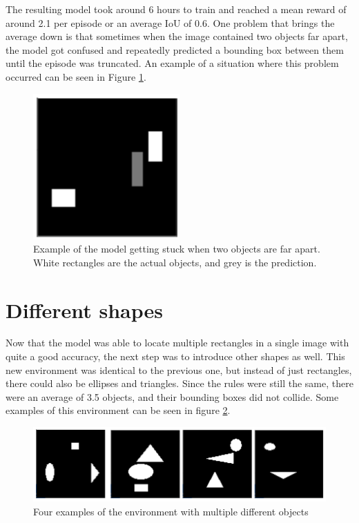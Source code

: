 \documentclass[
  digital,     %
  oneside,     %
  nosansbold,  %
  nocolorbold, %
  lof,         %
  lot,         %
]{fithesis4}
\begin{document}
The resulting model took around 6 hours to train and reached a mean reward of around 2.1 per episode or an average IoU of 0.6. One problem that brings the average down is that sometimes when the image contained two objects far apart, the model got confused and repeatedly predicted a bounding box between them until the episode was truncated. An example of a situation where this problem occurred can be seen in Figure \ref{fig:v3_stuck}.

\begin{figure}
    \centering
    \includegraphics[width=0.5\linewidth]{results/v3_stuck.png}
    \caption{Example of the model getting stuck when two objects are far apart. White rectangles are the actual objects, and grey is the prediction.}
    \label{fig:v3_stuck}
\end{figure}

\section{Different shapes}
Now that the model was able to locate multiple rectangles in a single image with quite 
 a good accuracy, the next step was to introduce other shapes as well. This new environment was identical to the previous one, but instead of just rectangles, there could also be ellipses and triangles. Since the rules were still the same, there were an average of 3.5 objects, and their bounding boxes did not collide. Some examples of this environment can be seen in figure \ref{fig:env4}.

\begin{figure}
    \includegraphics[width=1\linewidth]{env_examples/env4.png}
    \caption{Four examples of the environment with multiple different objects}
    \label{fig:env4}
\end{figure}
 
\end{document}
